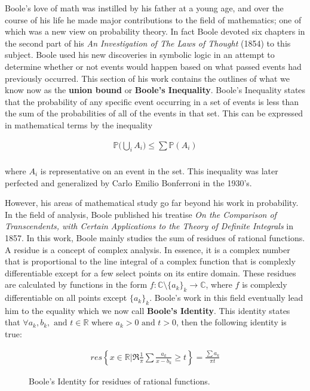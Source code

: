\documentclass[12]{article} %
\begin{document}
Boole's love of math was instilled by his father at a young age, and over the course of his life he made major contributions to the field of mathematics; one of which was a new view on probability theory. In fact Boole devoted six chapters in the second part of his \textit{An Investigation of The Laws of Thought} (1854) to this subject. Boole used his new discoveries in symbolic logic in an attempt to determine whether or not events would happen based on what passed events had previously occurred. This section of his work contains the outlines of what we know now as the \textbf{union bound} or \textbf{Boole's Inequality}. Boole's Inequality states that the probability of any specific event occurring in a set of events is less than the sum of the probabilities of all of the events in that set. This can be expressed in mathematical terms by the inequality

\begin{eqnarray*}
\mathbb{P}\bigg(\bigcup\limits_{i} A_{i}\bigg)\leq\sum\mathbb{P}(A_{i})
\end{eqnarray*}\\
where $A_{i}$ is representative on an event in the set. This inequality was later perfected and generalized by Carlo Emilio Bonferroni in the 1930's.

However, his areas of mathematical study go far beyond his work in probability. In the field of analysis, Boole published his treatise \textit{On the Comparison of Transcendents, with Certain Applications to the Theory of Definite Integrals} in 1857. In this work, Boole mainly studies the sum of residues of rational functions. A residue is a concept of complex analysis. In essence, it is a complex number that is proportional to the line integral of a complex function that is complexly differentiable except for a few select points on its entire domain. These residues are calculated by functions in the form $f: \mathbb{C}\setminus \{a_{k}\}_{k} \rightarrow \mathbb{C}$, where $f$ is complexly differentiable on all points except $\{a_{k}\}_{k}$. Boole's work in this field eventually lead him to the equality which we now call \textbf{Boole's Identity}. This identity states that $\forall a_{k},b_{k}, \text{ and } t \in \mathbb{R}$ where $a_{k} > 0 \text{ and } t > 0$, then the following identity is true:
\begin{figure}[H]
\begin{eqnarray*}
res\left\{x\in\mathbb{R}|\Re\frac{1}{\pi}\sum\frac{a_{k}}{x - b_{k}}\geq t\right\} = \frac{\sum a_{k}}{\pi t}
\end{eqnarray*}
\caption{Boole's Identity for residues of rational functions.}
\end{figure}
\end{document}
